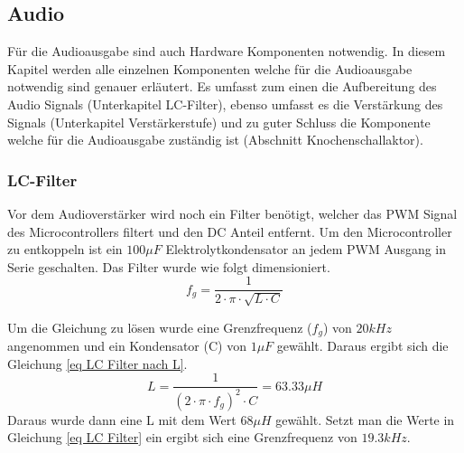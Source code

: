 \subsection{Audio} \label{sec:audio}
Für die Audioausgabe sind auch Hardware Komponenten notwendig. In diesem Kapitel werden alle einzelnen Komponenten welche für die Audioausgabe notwendig sind genauer erläutert. Es umfasst zum einen die Aufbereitung des Audio Signals (Unterkapitel LC-Filter), ebenso umfasst es die Verstärkung des Signals (Unterkapitel Verstärkerstufe) und zu guter Schluss die Komponente welche für die Audioausgabe zuständig ist (Abschnitt Knochenschallaktor).

\subsubsection*{LC-Filter}\label{sec:schutzeinrichtung}
Vor dem Audioverstärker wird noch ein Filter benötigt, welcher das PWM Signal des Microcontrollers filtert und den DC Anteil entfernt. Um den Microcontroller zu entkoppeln ist ein $100\mu F$ Elektrolytkondensator an jedem PWM Ausgang in Serie geschalten. Das Filter wurde wie folgt dimensioniert. 
\begin{equation}
f_g = \frac{1}{2\cdot \pi \cdot \sqrt{L\cdot C}}
\label{eq LC Filter}
\end{equation}

Um die Gleichung zu lösen wurde eine Grenzfrequenz ($f_g$) von $20kHz$ angenommen und ein Kondensator (C) von $1\mu F$ gewählt. Daraus ergibt sich die Gleichung \ref{eq LC Filter nach L}. 
\begin{equation}
L = \frac{1}{(2\cdot \pi \cdot f_g)^2\cdot C } = 63.33\mu H
\label{eq LC Filter nach L}
\end{equation}
Daraus wurde dann eine L mit dem Wert $68\mu H$ gewählt. Setzt man die Werte in Gleichung \ref{eq LC Filter} ein ergibt sich eine Grenzfrequenz von $19.3kHz$. 


